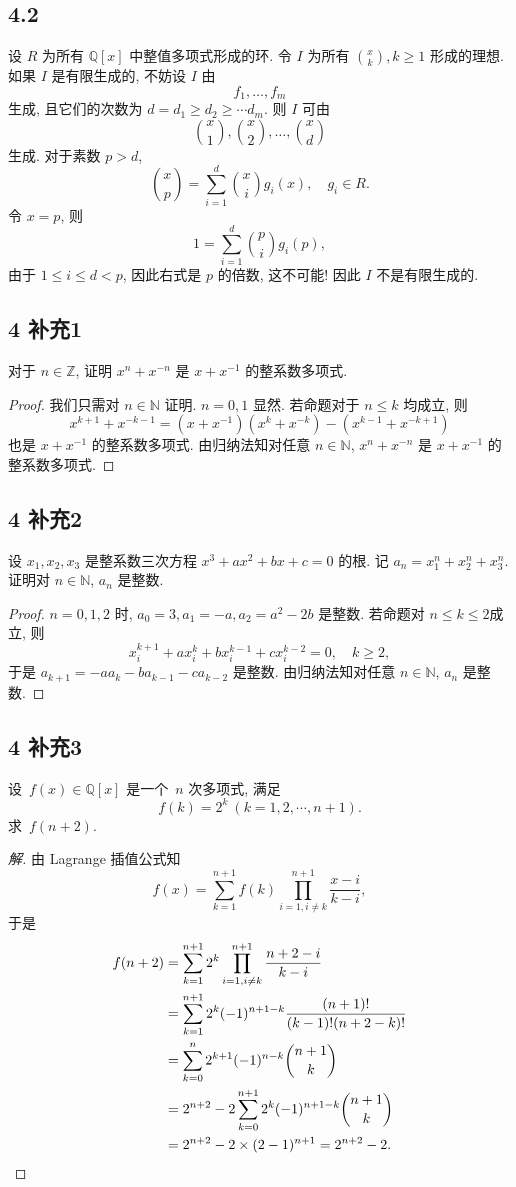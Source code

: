 \documentclass[12pt,a4paper,reqno]{amsart}
\theoremstyle{remark}
\newcommand{\Z}{\mathbb{Z}}
\newcommand{\N}{\mathbb{N}}
\newcommand{\Q}{\mathbb{Q}}
\renewcommand{\le}{\leqslant}
\renewcommand{\ge}{\geqslant}
\begin{document}
\subsection*{4.2}
设 $R$ 为所有 $\Q[x]$ 中整值多项式形成的环. 令 $I$ 为所有 ${x\choose k}, k\ge 1$ 形成的理想. 如果 $I$ 是有限生成的, 不妨设 $I$ 由
  \[f_1,\ldots,f_m\]
生成, 且它们的次数为 $d=d_1\ge d_2\ge\cdots d_m$. 则 $I$ 可由
  \[{x\choose 1},{x\choose 2},\ldots,{x\choose d}\]
生成. 对于素数 $p>d$,
  \[{x\choose p}=\sum_{i=1}^d {x\choose i}g_i(x),\quad g_i\in R.\]
令 $x=p$, 则
  \[1=\sum_{i=1}^d {p\choose i} g_i(p),\]
由于 $1\le i\le d< p$, 因此右式是 $p$ 的倍数, 这不可能! 因此 $I$ 不是有限生成的.

\subsection*{4 补充1}
对于 $n\in\Z$, 证明 $x^n+x^{-n}$ 是 $x+x^{-1}$ 的整系数多项式.
\begin{proof}
我们只需对 $n\in\N$ 证明. $n=0,1$ 显然. 若命题对于 $n\le k$ 均成立, 则
  \[x^{k+1}+x^{-k-1}=(x+x^{-1})(x^k+x^{-k})-(x^{k-1}+x^{-k+1})\]
也是 $x+x^{-1}$ 的整系数多项式. 由归纳法知对任意 $n\in\N$, $x^n+x^{-n}$ 是 $x+x^{-1}$ 的整系数多项式.
\end{proof}

\subsection*{4 补充2}
设 $x_1,x_2,x_3$ 是整系数三次方程 $x^3+ax^2+bx+c=0$ 的根. 记 $a_n=x^n_1+x_2^n+x_3^n$. 证明对 $n\in\N$, $a_n$ 是整数.
\begin{proof}
$n=0,1,2$ 时, $a_0=3,a_1=-a,a_2=a^2-2b$ 是整数. 若命题对 $n\le k\le 2$成立, 则
  \[x_i^{k+1}+ax_i^k+bx_i^{k-1}+cx_i^{k-2}=0,\quad k\ge 2,\]
于是 $a_{k+1}=-a a_k-b a_{k-1}-c a_{k-2}$ 是整数. 由归纳法知对任意 $n\in\N$, $a_n$ 是整数.
\end{proof}

\subsection*{4 补充3}
设\ $f(x)\in\Q[x]$ 是一个\ $n$ 次多项式, 满足
  \[f(k)=2^k\ (k=1,2,\cdots,n+1).\]
求\ $f(n+2)$.
\begin{proof}[解]
由 Lagrange 插值公式知
  \[ f(x)=\sum_{k=1}^{n+1}f(k)\prod_{i=1,i\neq k}^{n+1} \frac{x-i}{k-i},\]
于是
  \[\begin{split}
    f(n+2)&=\sum_{k=1}^{n+1}2^k\prod_{i=1,i\neq k}^{n+1} \frac{n+2-i}{k-i}\\
    &=\sum_{k=1}^{n+1}2^k (-1)^{n+1-k}\frac{(n+1)!}{(k-1)!(n+2-k)!}\\
    &=\sum_{k=0}^{n}2^{k+1}(-1)^{n-k}{n+1\choose k}\\
    &=2^{n+2}-2\sum_{k=0}^{n+1}2^{k}(-1)^{n+1-k}{n+1\choose k}\\
    &=2^{n+2}-2\times(2-1)^{n+1}=2^{n+2}-2.\qedhere
  \end{split}\]
\end{proof}
\end{document}
